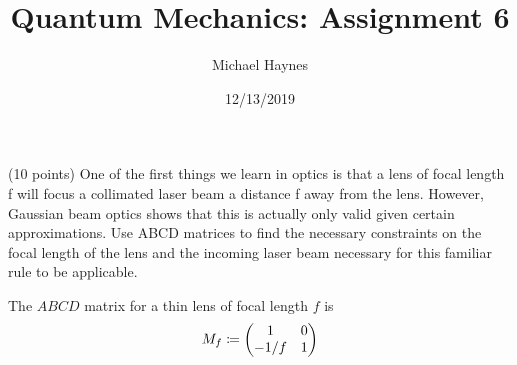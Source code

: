 \documentclass{article}
\newcounter{problem}
\newcounter{problempart}
\newcommand{\theheadertitle}{}
\newcommand{\headertitle}[1]{\renewcommand{\theheadertitle}{#1}}
\numberwithin{equation}{problem}
\theoremstyle{definition}
\theoremstyle{remark}
\begin{document}
\author{Michael Haynes}
\title{Quantum Mechanics: Assignment 6}
\headertitle{HW 8}
\date{12/13/2019}
\titlepage
\maketitle

\newpage
\begin{problem}[Problem 1] \label{ABCD_Problem}

\begin{problemstatement}

(10 points) One of the first things we learn in optics is that a lens of focal length f will focus a collimated laser beam a distance f away from the lens. However, Gaussian
beam optics shows that this is actually only valid given certain approximations. Use
ABCD matrices to find the necessary constraints on the focal length of the lens and
the incoming laser beam necessary for this familiar rule to be applicable.

\end{problemstatement}

%
%
%

The $ABCD$ matrix for a thin lens of focal length $f$ is 
\begin{equation} \label{lens_matrix_defn}
M_f \coloneqq \mqty(1 & 0 \\ -1/f & 1)
\end{equation}



\end{problem}
\end{document}
